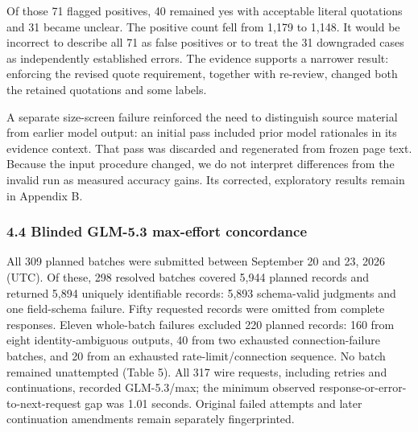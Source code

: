 \documentclass[10pt]{article}
\begin{document}
Of those 71 flagged positives, 40 remained yes with acceptable literal quotations and 31 became unclear. The positive count fell from 1,179 to 1,148. It would be incorrect to describe all 71 as false positives or to treat the 31 downgraded cases as independently established errors. The evidence supports a narrower result: enforcing the revised quote requirement, together with re-review, changed both the retained quotations and some labels.

A separate size-screen failure reinforced the need to distinguish source material from earlier model output: an initial pass included prior model rationales in its evidence context. That pass was discarded and regenerated from frozen page text. Because the input procedure changed, we do not interpret differences from the invalid run as measured accuracy gains. Its corrected, exploratory results remain in Appendix B.

\hypertarget{blinded-glm-5.3-max-effort-concordance}{%
\subsubsection{4.4 Blinded GLM-5.3 max-effort concordance}\label{blinded-glm-5.3-max-effort-concordance}}

All 309 planned batches were submitted between September 20 and 23, 2026 (UTC). Of these, 298 resolved batches covered 5,944 planned records and returned 5,894 uniquely identifiable records: 5,893 schema-valid judgments and one field-schema failure. Fifty requested records were omitted from complete responses. Eleven whole-batch failures excluded 220 planned records: 160 from eight identity-ambiguous outputs, 40 from two exhausted connection-failure batches, and 20 from an exhausted rate-limit/connection sequence. No batch remained unattempted (Table 5). All 317 wire requests, including retries and continuations, recorded GLM-5.3/max; the minimum observed response-or-error-to-next-request gap was 1.01 seconds. Original failed attempts and later continuation amendments remain separately fingerprinted.
\end{document}
